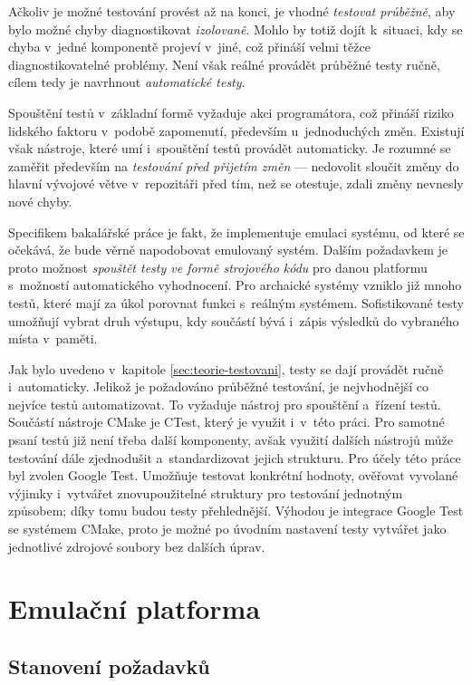 Ačkoliv je možné testování provést až na konci, je vhodné \emph{testovat průběžně}, aby bylo možné chyby diagnostikovat \emph{izolovaně}. Mohlo by totiž dojít k~situaci, kdy se chyba v~jedné komponentě projeví v~jiné, což přináší velmi těžce diagnostikovatelné problémy. Není však reálné provádět průběžné testy ručně, cílem tedy je navrhnout \emph{automatické testy}.

Spouštění testů v~základní formě vyžaduje akci programátora, což přináší riziko lidského faktoru v~podobě zapomenutí, především u~jednoduchých změn. Existují však nástroje, které umí i~spouštění testů provádět automaticky. Je rozumné se zaměřit především na \emph{testování před přijetím změn} --- nedovolit sloučit změny do hlavní vývojové větve v~repozitáři před tím, než se otestuje, zdali změny nevnesly nové chyby.

Specifikem bakalářské práce je fakt, že implementuje emulaci systému, od které se očekává, že bude věrně napodobovat emulovaný systém. Dalším požadavkem je proto možnost \emph{spouštět testy ve formě strojového kódu} pro danou platformu s~možností automatického vyhodnocení. Pro archaické systémy vzniklo již mnoho testů, které mají za úkol porovnat funkci s~reálným systémem. Sofistikované testy umožňují vybrat druh výstupu, kdy součástí bývá i~zápis výsledků do vybraného místa v~paměti.

Jak bylo uvedeno v~kapitole \ref{sec:teorie-testovani}, testy se dají provádět ručně i~automaticky. Jelikož je požadováno průběžné testování, je nejvhodnější co nejvíce testů automatizovat. To vyžaduje nástroj pro spouštění a~řízení testů. Součástí nástroje CMake je CTest, který je využit i~v~této práci. Pro samotné psaní testů již není třeba další komponenty, avšak využití dalších nástrojů může testování dále zjednodušit a~standardizovat jejich strukturu. Pro účely této práce byl zvolen Google Test. Umožňuje testovat konkrétní hodnoty, ověřovat vyvolané výjimky i~vytvářet znovupoužitelné struktury pro testování jednotným způsobem; díky tomu budou testy přehlednější. Výhodou je integrace Google Test se systémem CMake, proto je možné po úvodním nastavení testy vytvářet jako jednotlivé zdrojové soubory bez dalších úprav.

\section{Emulační platforma}
\subsection{Stanovení požadavků}
\label{sec:navrh-pozadavky}

